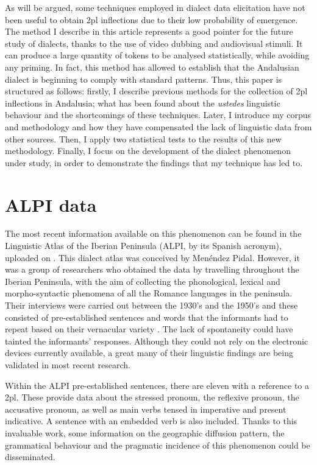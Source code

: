 \documentclass[output=paper]{LSP/langsci}
\begin{document}
As will be argued, some techniques employed in dialect data elicitation have not been useful to obtain 2pl inflections due to their low probability of emergence. The method I describe in this article represents a good pointer for the future study of dialects, thanks to the use of video dubbing and audiovisual stimuli. It can produce a large quantity of tokens to be analysed statistically, while avoiding any priming. In fact, this method has allowed to establish that the Andalusian dialect is beginning to comply with standard patterns. Thus, this paper is structured as follows: firstly, I describe previous methods for the collection of 2pl inflections in Andalusia; what has been found about the \textit{ustedes} linguistic behaviour and the shortcomings of these techniques. Later, I introduce my corpus and methodology and how they have compensated the lack of linguistic data from other sources. Then, I apply two statistical tests to the results of this new methodology. Finally, I focus on the development of the dialect phenomenon under study, in order to demonstrate the findings that my technique has led to.

\section{ALPI data}

The most recent information available on this phenomenon can be found in the Linguistic Atlas of the Iberian Peninsula (ALPI, by its Spanish acronym), uploaded on \citet{heap_atlas_2003}. This dialect atlas was conceived by Menéndez Pidal. However, it was a group of researchers who obtained the data by travelling throughout the Iberian Peninsula, with the aim of collecting the phonological, lexical and morpho-syntactic phenomena of all the Romance languages in the peninsula. Their interviews were carried out between the 1930’s and the 1950’s and these consisted of pre-established sentences and words that the informants had to repeat based on their vernacular variety \citep{sanchis_guarner_atlas_1962}. The lack of spontaneity could have tainted the informants’ responses. Although they could not rely on the electronic devices currently available, a great many of their linguistic findings are being validated in most recent research. 

Within the ALPI pre-established sentences, there are eleven with a reference to a 2pl. These provide data about the stressed pronoun, the reflexive pronoun, the accusative pronoun, as well as main verbs tensed in imperative and present indicative. A sentence with an embedded verb is also included. Thanks to this invaluable work, some information on the geographic diffusion pattern, the grammatical behaviour and the pragmatic incidence of this phenomenon could be disseminated.
\end{document}
